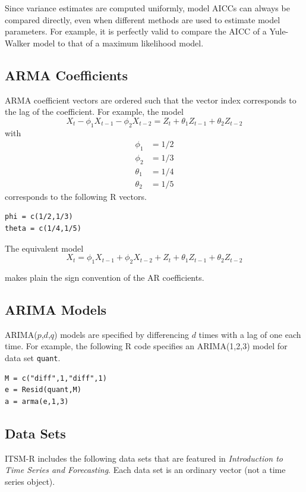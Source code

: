 \documentclass[12pt]{article}
\begin{document}
\bigskip
Since variance estimates are computed uniformly,
model AICCs can always be compared directly,
even when different methods are used to estimate model parameters.
For example, it is perfectly valid to compare the AICC of a Yule-Walker
model to that of a maximum likelihood model.

\subsection{ARMA Coefficients}
ARMA coefficient vectors are ordered such that
the vector index corresponds to the lag of the coefficient.
For example, the model
\[
X_t-\phi_1X_{t-1}-\phi_2X_{t-2}=Z_t+\theta_1Z_{t-1}+\theta_2Z_{t-2}
\]
with
\begin{align*}
\phi_1&=1/2\\
\phi_2&=1/3\\
\theta_1&=1/4\\
\theta_2&=1/5
\end{align*}
corresponds to the following R vectors.

\begin{verbatim}
phi = c(1/2,1/3)
theta = c(1/4,1/5)
\end{verbatim}

The equivalent model
\[
X_t=\phi_1X_{t-1}+\phi_2X_{t-2}
+Z_t+\theta_1Z_{t-1}+\theta_2Z_{t-2}
\]

makes plain the sign convention of the AR coefficients.

\subsection{ARIMA Models}
ARIMA($p$,$d$,$q$)
models are specified by differencing $d$ times with a lag of one each time.
For example, the following R code specifies an ARIMA(1,2,3) model
for data set {\tt quant}.

\begin{verbatim}
M = c("diff",1,"diff",1)
e = Resid(quant,M)
a = arma(e,1,3)
\end{verbatim}

\subsection{Data Sets}
ITSM-R includes the following data sets that are featured in
{\it Introduction to Time Series and Forecasting}.
Each data set is an ordinary vector (not a time series object).
\end{document}
